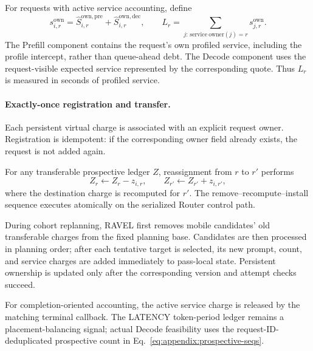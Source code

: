 For requests with active service accounting, define
\begin{equation}
    s^{\mathrm{own}}_{i,r}
    =
    \widehat{S}^{\mathrm{own,pre}}_{i,r}
    +
    \widehat{S}^{\mathrm{own,dec}}_{i,r},
    \qquad
    L_r
    =
    \sum_{j:\,\mathrm{service\ owner}(j)=r}
       s^{\mathrm{own}}_{j,r}.
    \label{eq:appendix:service-ledger}
\end{equation}
The Prefill component contains the request's own profiled service, including
the profile intercept, rather than queue-ahead debt.
The Decode component uses the request-visible expected service represented by
the corresponding quote.
Thus $L_r$ is measured in seconds of profiled service.

\paragraph{Exactly-once registration and transfer.}
Each persistent virtual charge is associated with an explicit request owner.
Registration is idempotent: if the corresponding owner field already exists,
the request is not added again.

For any transferable prospective ledger $Z$, reassignment from $r$ to $r'$
performs
\begin{equation}
    Z_r \leftarrow Z_r-z_{i,r},
    \qquad
    Z_{r'} \leftarrow Z_{r'}+z_{i,r'},
    \label{eq:appendix:account-transfer}
\end{equation}
where the destination charge is recomputed for $r'$.
The remove--recompute--install sequence executes atomically on the serialized
Router control path.

During cohort replanning, RAVEL first removes mobile candidates' old
transferable charges from the fixed planning base.
Candidates are then processed in planning order; after each tentative target
is selected, its new prompt, count, and service charges are added immediately
to pass-local state.
Persistent ownership is updated only after the corresponding version and
attempt checks succeed.

For completion-oriented accounting, the active service charge is released by
the matching terminal callback.
The LATENCY token-period ledger remains a placement-balancing signal; actual
Decode feasibility uses the request-ID-deduplicated prospective count in
Eq.~\ref{eq:appendix:prospective-seqs}.

